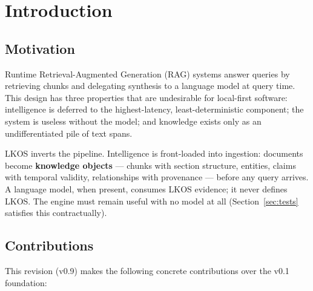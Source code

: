 \section{Introduction}\label{sec:intro}

\subsection{Motivation}\label{sec:motivation}

Runtime Retrieval-Augmented Generation (RAG) systems
\cite{lewis2020} answer queries by retrieving chunks and delegating synthesis
to a language model at query time. This design has three properties that are
undesirable for local-first software: intelligence is deferred to the
highest-latency, least-deterministic component; the system is useless without
the model; and knowledge exists only as an undifferentiated pile of text
spans.

LKOS inverts the pipeline. Intelligence is front-loaded into ingestion:
documents become \textbf{knowledge objects} --- chunks with section structure,
entities, claims with temporal validity, relationships with provenance ---
before any query arrives. A language model, when present, consumes LKOS
evidence; it never defines LKOS. The engine must remain useful with no model
at all (Section~\ref{sec:tests} satisfies this contractually).

\subsection{Contributions}\label{sec:contributions}

This revision (v0.9) makes the following concrete contributions over the v0.1
foundation:

